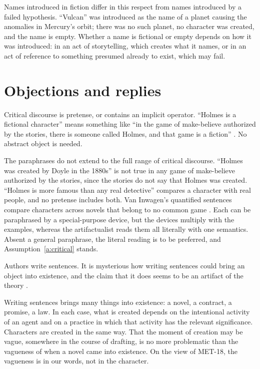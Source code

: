 \documentclass{situationist-preprint}
\begin{document}
Names introduced in fiction differ in this respect from names introduced by a failed hypothesis. \enquote{Vulcan} was introduced as the name of a planet causing the anomalies in Mercury's orbit; there was no such planet, no character was created, and the name is empty. Whether a name is fictional or empty depends on how it was introduced: in an act of storytelling, which creates what it names, or in an act of reference to something presumed already to exist, which may fail.

\section{Objections and replies}

\begin{objection}[Pretense]
Critical discourse is pretense, or contains an implicit operator. \enquote{Holmes is a fictional character} means something like \enquote{in the game of make-believe authorized by the stories, there is someone called Holmes, and that game is a fiction} \citep{Walton1990}. No abstract object is needed.
\end{objection}

\begin{reply}
The paraphrases do not extend to the full range of critical discourse. \enquote{Holmes was created by Doyle in the 1880s} is not true in any game of make-believe authorized by the stories, since the stories do not say that Holmes was created. \enquote{Holmes is more famous than any real detective} compares a character with real people, and no pretense includes both. Van Inwagen's quantified sentences compare characters across novels that belong to no common game \citep{vanInwagen1977}. Each can be paraphrased by a special-purpose device, but the devices multiply with the examples, whereas the artifactualist reads them all literally with one semantics. Absent a general paraphrase, the literal reading is to be preferred, and Assumption~\ref{a:critical} stands.
\end{reply}

\begin{objection}[Creation]
Authors write sentences. It is mysterious how writing sentences could bring an object into existence, and the claim that it does seems to be an artifact of the theory \citep{Brock2010}.
\end{objection}

\begin{reply}
Writing sentences brings many things into existence: a novel, a contract, a promise, a law. In each case, what is created depends on the intentional activity of an agent and on a practice in which that activity has the relevant significance. Characters are created in the same way. That the moment of creation may be vague, somewhere in the course of drafting, is no more problematic than the vagueness of when a novel came into existence. On the view of MET-18, the vagueness is in our words, not in the character.
\end{reply}
\end{document}
